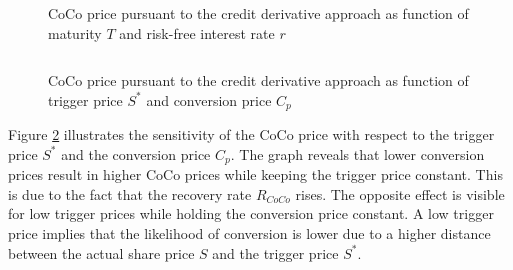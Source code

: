 \begin{figure}[H]
\centering
{}
    \caption[CoCo price pursuant to the credit derivative approach as function of maturity and interest rate]{CoCo price pursuant to the credit derivative approach as function of maturity $T$ and risk-free interest rate $r$}
  \label{fig:cd2}
  \end{figure}
$ $ \\
\begin{figure}[H]
\centering
    \caption[CoCo price pursuant to the credit derivative approach function of trigger price and conversion volatility]{CoCo price pursuant to the credit derivative approach as function of trigger price $S^*$ and conversion price $C_p$}
  \label{fig:cd3}
  \end{figure}

Figure \ref{fig:cd3} illustrates the sensitivity of the CoCo price with respect to the trigger price $S^*$ and the conversion price $C_p$. The graph reveals that lower conversion prices result in higher CoCo prices while keeping the trigger price constant. This is due to the fact that the recovery rate $R_{CoCo}$ rises. The opposite effect is visible for low trigger prices while holding the conversion price constant. A low trigger price implies that the likelihood of conversion is lower due to a higher distance between the actual share price $S$ and the trigger price $S^*$.

